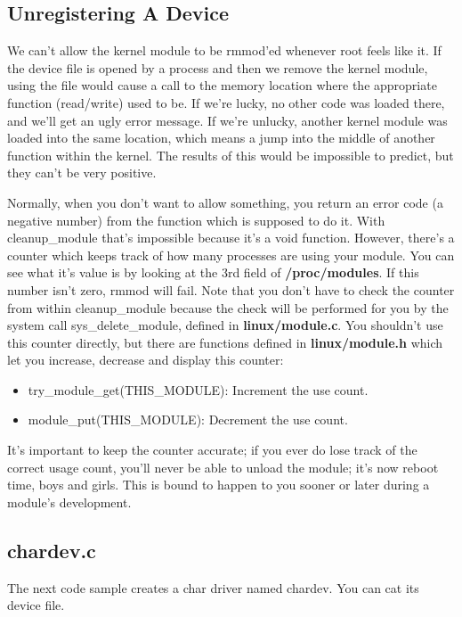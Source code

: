 \documentclass[11pt]{article}
\begin{document}
\subsection*{Unregistering A Device}
\label{sec-6-4}
We can't allow the kernel module to be rmmod'ed whenever root feels like it. If the device file is opened by a process and then we remove the kernel module, using the file would cause a call to the memory location where the appropriate function (read/write) used to be. If we're lucky, no other code was loaded there, and we'll get an ugly error message. If we're unlucky, another kernel module was loaded into the same location, which means a jump into the middle of another function within the kernel. The results of this would be impossible to predict, but they can't be very positive.

Normally, when you don't want to allow something, you return an error code (a negative number) from the function which is supposed to do it. With cleanup\_module that's impossible because it's a void function. However, there's a counter which keeps track of how many processes are using your module. You can see what it's value is by looking at the 3rd field of \textbf{/proc/modules}. If this number isn't zero, rmmod will fail. Note that you don't have to check the counter from within cleanup\_module because the check will be performed for you by the system call sys\_delete\_module, defined in \textbf{linux/module.c}. You shouldn't use this counter directly, but there are functions defined in \textbf{linux/module.h} which let you increase, decrease and display this counter:

\begin{itemize}
\item try\_module\_get(THIS\_MODULE): Increment the use count.
\item module\_put(THIS\_MODULE): Decrement the use count.
\end{itemize}

It's important to keep the counter accurate; if you ever do lose track of the correct usage count, you'll never be able to unload the module; it's now reboot time, boys and girls. This is bound to happen to you sooner or later during a module's development.

\subsection*{chardev.c}
\label{sec-6-5}
The next code sample creates a char driver named chardev. You can cat its device file.
\end{document}
